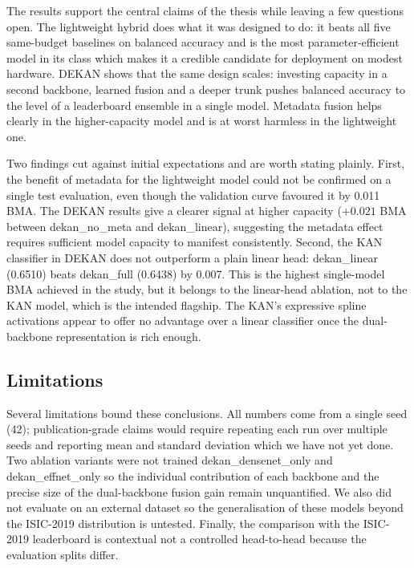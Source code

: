 The results support the central claims of the thesis while leaving a few
questions open. The lightweight hybrid does what it was designed to do: it beats
all five same-budget baselines on balanced accuracy and is the most
parameter-efficient model in its class which makes it a credible candidate for
deployment on modest hardware. DEKAN shows that the same design scales: investing
capacity in a second backbone, learned fusion and a deeper trunk pushes balanced
accuracy to the level of a leaderboard ensemble in a single model. Metadata
fusion helps clearly in the higher-capacity model and is at worst harmless in
the lightweight one.

Two findings cut against initial expectations and are worth stating plainly.
First, the benefit of metadata for the lightweight model could not be confirmed
on a single test evaluation, even though the validation curve favoured it by
0.011 BMA. The DEKAN results give a clearer signal at higher capacity
($+0.021$ BMA between dekan\_no\_meta and dekan\_linear), suggesting the
metadata effect requires sufficient model capacity to manifest consistently.
Second, the KAN classifier in DEKAN does not outperform a plain linear head:
dekan\_linear (0.6510) beats dekan\_full (0.6438) by 0.007. This is the
highest single-model BMA achieved in the study, but it belongs to the
linear-head ablation, not to the KAN model, which is the intended flagship.
The KAN's expressive spline activations appear to offer no advantage over a
linear classifier once the dual-backbone representation is rich enough.

\subsection{Limitations}

Several limitations bound these conclusions. All numbers come from a single seed
(42); publication-grade claims would require repeating each run over multiple
seeds and reporting mean and standard deviation which we have not yet done.
Two ablation variants were not trained dekan\_densenet\_only and
dekan\_effnet\_only so the individual contribution of each backbone and the
precise size of the dual-backbone fusion gain remain unquantified. We also did
not evaluate on an external dataset so the generalisation of these models beyond
the ISIC-2019 distribution is untested. Finally, the comparison with the
ISIC-2019 leaderboard is contextual not a controlled head-to-head because the
evaluation splits differ.

